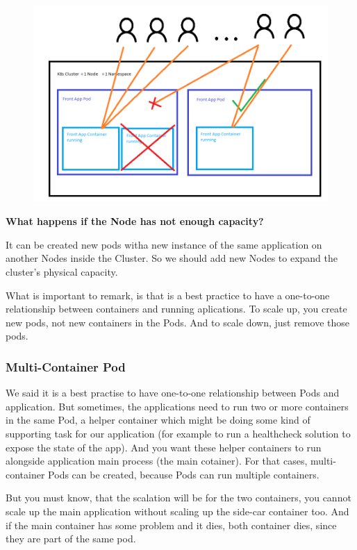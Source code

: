 \documentclass{article}
\newenvironment{blocktemplate}[1]{%
    \tcolorbox[beamer,%
    noparskip,breakable,
    colframe=Blue,%
    colbacklower=LimeGreen!75!LightGreen,%
    title=#1]}%
    {\endtcolorbox}
\begin{document}
\begin{figure}[H]
    \includegraphics[scale=0.5]{pictures/image3.png}
\end{figure}

\textbf{What happens if the Node has not enough capacity?}

It can be created new pods witha new instance of the same application on another Nodes inside the Cluster. So we should add new Nodes to expand the cluster's physical capacity.

\begin{blocktemplate}{Note}
What is important to remark, is that is a best practice to have a one-to-one relationship between containers and running aplications. To scale up, you create new pods, not new containers in the Pods. And to scale down, just remove those pods.
\end{blocktemplate}


\subsubsection{Multi-Container Pod}

We said it is a best practise to have one-to-one relationship between Pods and application. But sometimes, the applications need to run two or more containers in the same Pod, a helper container which might be doing some kind of supporting task for our application (for example to run a healthcheck solution to expose the state of the app). And you want these helper containers to run alongside application main process (the main cotainer). For that cases, multi-container Pods can be created, because Pods can run multiple containers.

But you must know, that the scalation will be for the two containers, you cannot scale up the main application without scaling up the side-car container too. And if the main container has some problem and it dies, both container dies, since they are part of the same pod.
\end{document}
